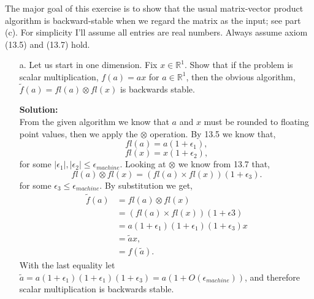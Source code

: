 \documentclass[12pt]{article}
\makeatletter
\theoremstyle{homework}
\newenvironment{exercise}[1]
{\def\@currentlabel{#1}\exercisecore}
{\endexercisecore}
\newcommand{\localhead}[1]{\par\smallskip\noindent\textbf{#1}\nobreak\\}%
\newcommand\solution{\localhead{Solution:}}
\newcommand{\Reals}{\ensuremath{\mathbb R}}
\newcommand{\emach}{\ensuremath{\epsilon_{machine}}}
\let\RR\Reals
\makeatother
\begin{document}
\begin{exercise}{P21} The major goal of this exercise is to show that the usual matrix-vector product algorithm is backward-stable
  when we regard the matrix as the input; see part (c). For simplicity I'll assume all entries are real numbers. Always assume axiom (13.5) and
  (13.7) hold.\\
  \begin{enumerate}
    \item[a.] Let us start in one dimension. Fix $x\in \RR^1$. Show that if the problem is scalar multiplication, $f(a) = ax$ for $a \in \RR^1$, 
    then the obvious algorithm, $\tilde{f}(a) = fl(a) \otimes fl(x)$ is backwards stable. \\
    \solution From the given algorithm we know that $a$ and $x$ must be rounded to floating point values, then we apply the $\otimes$ operation. 
    By 13.5 we know that, 
    \begin{equation*}
      fl(a) = a(1 + \epsilon_1),
    \end{equation*}
    \begin{equation*}
      fl(x) = x(1+ \epsilon_2), 
    \end{equation*}
    for some $|\epsilon_{1}|, |\epsilon_{2}| \leq \emach$. Looking at $\otimes$ we know from 13.7 that, 
    \begin{equation*}
      fl(a) \otimes fl(x) = (fl(a) \times fl(x))(1 + \epsilon_{3}).
    \end{equation*}
    for some $\epsilon_{3} \leq \emach$. By substitution we get, 
    \begin{align*}
      \tilde{f}(a) &= fl(a) \otimes fl(x)\\
      &= (fl(a) \times fl(x))(1 + \epsilon{3})\\
      &= a(1 + \epsilon_1)(1 + \epsilon_1)(1 + \epsilon_{3})x\\
      &= \tilde{a}x,\\
      &= f(\tilde{a}).
    \end{align*}
    With the last equality let $\tilde{a} = a(1 + \epsilon_1)(1 + \epsilon_1)(1 + \epsilon_{3}) = a(1 + O(\emach))$, and therefore scalar multiplication is 
    backwards stable. 
  \vspace{.15in}






\end{enumerate}
\end{exercise}
\end{document}
